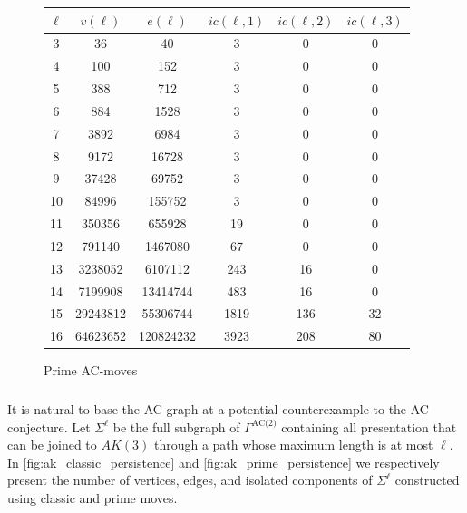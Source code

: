 \begin{figure}
	\begin{tabular}{|c|c|c|c|c|c|}
		\hline
		$\ell$ & $v(\ell)$ & $e(\ell)$ & $ic(\ell,1)$ & $ic(\ell,2)$ & $ic(\ell,3)$ \\ \hline
		3 & 36 & 40 & 3 & 0 & 0 \\ \hline
		4 & 100 & 152 & 3 & 0 & 0 \\ \hline
		5 & 388 & 712 & 3 & 0 & 0 \\ \hline
		6 & 884 & 1528 & 3 & 0 & 0 \\ \hline
		7 & 3892 & 6984 & 3 & 0 & 0 \\ \hline
		8 & 9172 & 16728 & 3 & 0 & 0 \\ \hline
		9 & 37428 & 69752 & 3 & 0 & 0 \\ \hline
		10 & 84996 & 155752 & 3 & 0 & 0 \\ \hline
		11 & 350356 & 655928 & 19 & 0 & 0 \\ \hline
		12 & 791140 & 1467080 & 67 & 0 & 0 \\ \hline
		13 & 3238052 & 6107112 & 243 & 16 & 0 \\ \hline
		14 & 7199908 & 13414744 & 483 & 16 & 0 \\ \hline
		15 & 29243812 & 55306744 & 1819 & 136 & 32 \\ \hline
		16 & 64623652 & 120824232 & 3923 & 208 & 80 \\ \hline
	\end{tabular}
	\caption{Prime AC-moves}
	\label{fig:prime_persistence}
\end{figure}

\subsubsection{}

It is natural to base the AC-graph at a potential counterexample to the AC conjecture.
Let \(\Sigma^\ell\) be the full subgraph of \(\Gamma^{\text{AC(2)}}\) containing all presentation that can be joined to \(AK(3)\) through a path whose maximum length is at most \(\ell\).
In \autoref{fig:ak_classic_persistence} and \autoref{fig:ak_prime_persistence} we respectively present the number of vertices, edges, and isolated components of \(\Sigma^\ell\) constructed using classic and prime moves.


